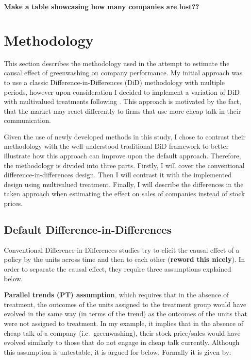 \documentclass[12pt]{article}
\begin{document}
\vspace{1cm}
\textbf{Make a table showcasing how many companies are lost??}



\section{Methodology}\label{sect:methodology}

This section describes the methodology used in the attempt to estimate the causal effect of greenwashing on company performance.
My initial approach was to use a classic Difference-in-Differences (DiD) methodology with multiple periods, however upon consideration I decided to implement a variation of DiD with multivalued treatments following \parencite{callawayDifferenceindifferencesContinuousTreatment2024}. This approach is motivated by the fact, that the market may react differently to firms that use more cheap talk in their communication. 

Given the use of newly developed methods in this study, I chose to contrast their methodology with the well-understood traditional DiD framework to better illustrate how this approach can improve upon the default approach. Therefore, the methodology is divided into three parts. Firstly, I will cover the conventional difference-in-differences design. Then I will contrast it with the implemented design using multivalued treatment. Finally, I will describe the differences in the taken approach when estimating the effect on sales of companies instead of stock prices.


\subsection{Default Difference-in-Differences}

Conventional Difference-in-Differences studies try to elicit the causal effect of a policy by the units across time and then to each other (\textbf{reword this nicely}). In order to separate the causal effect, they require three assumptions explained below. 

\textbf{Parallel trends (PT) assumption}, which requires that in the absence of treatment, the outcomes of the units assigned to the treatment group would have evolved in the same way (in terms of the trend) as the outcomes of the units that were not assigned to treatment. In my example, it implies that in the absence of cheap-talk of a company (i.e.\ greenwashing), their stock price/sales would have evolved similarly to those that do not engage in cheap talk currently. Although this assumption is untestable, it is argued for below. Formally it is given by: 
\end{document}

